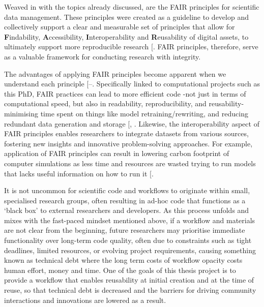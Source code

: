 \documentclass[
  11pt,
  letterpaper,
]{scrreprt}
\begin{document}
Weaved in with the topics already discussed, are the FAIR principles for
scientific data management. These principles were created as a guideline
to develop and collectively support a clear and measurable set of
principles that allow for \textbf{F}indability, \textbf{A}ccessibility,
\textbf{I}nteroperability and \textbf{R}eusability of digital assets, to
ultimately support more reproducible research
{[}\citeproc{ref-wilkinson2016FAIRa}{371}{]}. FAIR principles,
therefore, serve as a valuable framework for conducting research with
integrity.

The advantages of applying FAIR principles become apparent when we
understand each principle
{[}--\citeproc{ref-kim2024Findability}{374}{]}.
Specifically linked to computational projects such as this PhD, FAIR
practices can lead to more efficient code -not just in terms of
computational speed, but also in readability, reproducibility, and
reusability- minimising time spent on things like model
retraining/rewriting, and reducing redundant data generation and storage
{[},
\citeproc{ref-hasselbring2019FAIR}{375}{]}. Likewise, the
interoperability aspect of FAIR principles enables researchers to
integrate datasets from various sources, fostering new insights and
innovative problem-solving approaches. For example, application of FAIR
principles can result in lowering carbon footprint of computer
simulations as less time and resources are wasted trying to run models
that lacks useful information on how to run it
{[}\citeproc{ref-lannelongue2023GREENER}{376}{]}.

It is not uncommon for scientific code and workflows to originate within
small, specialised research groups, often resulting in ad-hoc code that
functions as a `black box' to external researchers and developers. As
this process unfolds and mixes with the fast-paced mindset mentioned
above, if a workflow and materials are not clear from the beginning,
future researchers may prioritise immediate functionality over long-term
code quality, often due to constraints such as tight deadlines, limited
resources, or evolving project requirements, causing something known as
technical debt where the long term costs of workflow opacity costs human
effort, money and time. One of the goals of this thesis project is to
provide a workflow that enables reusability at initial creation and at
the time of reuse, so that technical debt is decreased and the barriers
for driving community interactions and innovations are lowered as a
result.
\end{document}
